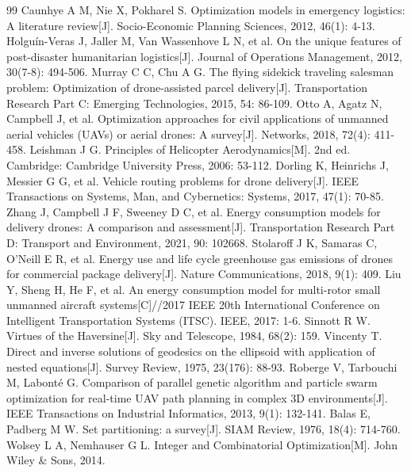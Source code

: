 \documentclass[withoutpreface,bwprint]{format}
\begin{document}
\begin{thebibliography}{99}
 Caunhye A M, Nie X, Pokharel S. Optimization models in emergency logistics: A literature review[J]. Socio-Economic Planning Sciences, 2012, 46(1): 4-13.
 Holguín-Veras J, Jaller M, Van Wassenhove L N, et al. On the unique features of post-disaster humanitarian logistics[J]. Journal of Operations Management, 2012, 30(7-8): 494-506.
 Murray C C, Chu A G. The flying sidekick traveling salesman problem: Optimization of drone-assisted parcel delivery[J]. Transportation Research Part C: Emerging Technologies, 2015, 54: 86-109.
 Otto A, Agatz N, Campbell J, et al. Optimization approaches for civil applications of unmanned aerial vehicles (UAVs) or aerial drones: A survey[J]. Networks, 2018, 72(4): 411-458.
 Leishman J G. Principles of Helicopter Aerodynamics[M]. 2nd ed. Cambridge: Cambridge University Press, 2006: 53-112.
 Dorling K, Heinrichs J, Messier G G, et al. Vehicle routing problems for drone delivery[J]. IEEE Transactions on Systems, Man, and Cybernetics: Systems, 2017, 47(1): 70-85.
 Zhang J, Campbell J F, Sweeney D C, et al. Energy consumption models for delivery drones: A comparison and assessment[J]. Transportation Research Part D: Transport and Environment, 2021, 90: 102668.
 Stolaroff J K, Samaras C, O'Neill E R, et al. Energy use and life cycle greenhouse gas emissions of drones for commercial package delivery[J]. Nature Communications, 2018, 9(1): 409.
 Liu Y, Sheng H, He F, et al. An energy consumption model for multi-rotor small unmanned aircraft systems[C]//2017 IEEE 20th International Conference on Intelligent Transportation Systems (ITSC). IEEE, 2017: 1-6.
 Sinnott R W. Virtues of the Haversine[J]. Sky and Telescope, 1984, 68(2): 159.
 Vincenty T. Direct and inverse solutions of geodesics on the ellipsoid with application of nested equations[J]. Survey Review, 1975, 23(176): 88-93.
 Roberge V, Tarbouchi M, Labonté G. Comparison of parallel genetic algorithm and particle swarm optimization for real-time UAV path planning in complex 3D environments[J]. IEEE Transactions on Industrial Informatics, 2013, 9(1): 132-141.
 Balas E, Padberg M W. Set partitioning: a survey[J]. SIAM Review, 1976, 18(4): 714-760.
 Wolsey L A, Nemhauser G L. Integer and Combinatorial Optimization[M]. John Wiley \& Sons, 2014.

\end{thebibliography}
\end{document}

